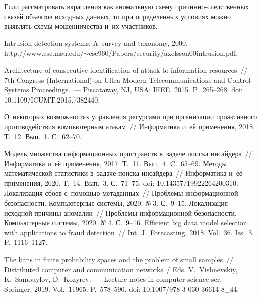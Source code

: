 \begin{multicols}{2}
  Если рассматривать вкрапления как аномальную схему  
при\-чин\-но-след\-ст\-вен\-ных связей объектов исходных данных, то при 
определенных условиях можно выявлять схемы мошенничества и~их участников.
  
{\small\frenchspacing
 {%
 \begin{thebibliography}{99} 
 Intrusion detection systems: A~survey and taxonomy, 2000. {\sf 
http://www.cse.msu.edu/$\sim$cse960/\linebreak Papers/security/axelsson00intrusion.pdf}.

 Architecture of consecutive 
identification of attack to information resources~// 7th  Congress (International) on Ultra Modern 
Telecommunications and Control Systems Proceedings.~--- Piscataway, NJ, USA: IEEE, 
2015. P.~265--268. doi: 10.1109/ICUMT.2015.7382440. 

 О~некоторых 
возможностях управления ресурсами при организации проактивного противодействия 
компьютерным атакам~// Информатика и~её применения, 2018. Т.~12. Вып.~1. С.~62--70.

 Модель множества 
информационных пространств в~задаче поиска инсайдера~// Информатика и~её применения, 
2017. Т.~11. Вып.~4. C.~65--69.
 Методы 
математической статистики в~задаче поиска инсайдера~// Информатика и~её применения, 2020. 
Т.~14. Вып.~3. С.~71--75. doi: 10.14357/19922264200310.
 Локализация сбоев с~помощью метаданных~// 
Проблемы информационной безопасности. Компьютерные системы, 2020. №\,3. С.~9--15.
 Локализация исходной 
причины аномалии~// Проб\-ле\-мы информационной безопас\-ности. Компьютерные системы, 
2020. №\,4. С.~9--16.
 Efficient big data model selection with applications to fraud detection~// Int.  
J.~Forecasting, 2018. Vol.~36. Iss.~3. P.~1116--1127.

 The bans in finite probability spaces and the problem of 
small samples~// Distributed computer and communication networks~/ Eds. V.~Vishnevskiy, 
K.~Samouylov, D.~Kozyrev.~--- Lecture notes in computer science ser.~--- Springer, 2019. 
Vol.~11965. P.~578--590. doi: 10.1007/978-3-030-36614-8\_44. 


\end{thebibliography}}}
\end{multicols}
